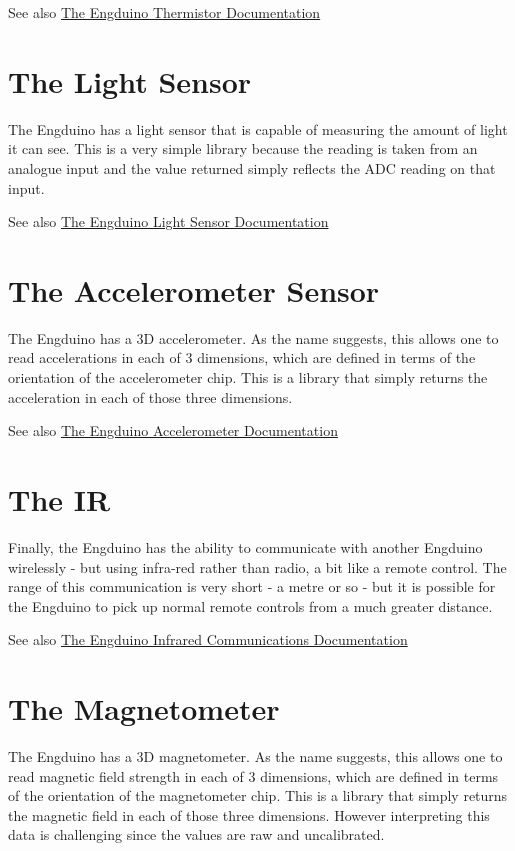 \begin{DoxySeeAlso}{See also}
\hyperlink{class_engduino_thermistor_class}{The Engduino Thermistor Documentation }
\end{DoxySeeAlso}
\hypertarget{index_Light}{}\section{The Light Sensor}\label{index_Light}
The Engduino has a light sensor that is capable of measuring the amount of light it can see. This is a very simple library because the reading is taken from an analogue input and the value returned simply reflects the A\+D\+C reading on that input.

\begin{DoxySeeAlso}{See also}
\hyperlink{class_engduino_light_class}{The Engduino Light Sensor Documentation }
\end{DoxySeeAlso}
\hypertarget{index_Accelerometer}{}\section{The Accelerometer Sensor}\label{index_Accelerometer}
The Engduino has a 3\+D accelerometer. As the name suggests, this allows one to read accelerations in each of 3 dimensions, which are defined in terms of the orientation of the accelerometer chip. This is a library that simply returns the acceleration in each of those three dimensions.

\begin{DoxySeeAlso}{See also}
\hyperlink{class_engduino_accelerometer_class}{The Engduino Accelerometer Documentation }
\end{DoxySeeAlso}
\hypertarget{index_IR}{}\section{The I\+R}\label{index_IR}
Finally, the Engduino has the ability to communicate with another Engduino wirelessly -\/ but using infra-\/red rather than radio, a bit like a remote control. The range of this communication is very short -\/ a metre or so -\/ but it is possible for the Engduino to pick up normal remote controls from a much greater distance.

\begin{DoxySeeAlso}{See also}
\hyperlink{class_engduino_i_r_class}{The Engduino Infrared Communications Documentation }
\end{DoxySeeAlso}
\hypertarget{index_Magnetometer}{}\section{The Magnetometer}\label{index_Magnetometer}
The Engduino has a 3\+D magnetometer. As the name suggests, this allows one to read magnetic field strength in each of 3 dimensions, which are defined in terms of the orientation of the magnetometer chip. This is a library that simply returns the magnetic field in each of those three dimensions. However interpreting this data is challenging since the values are raw and uncalibrated.

